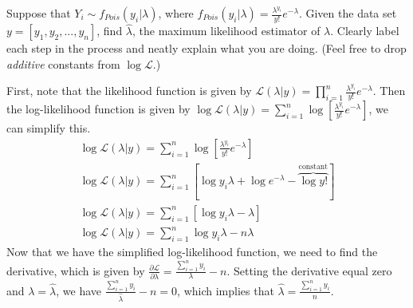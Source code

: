 \documentclass[10pt]{exam2}
\begin{document}
\begin{questions}
\question Suppose that $Y_i \sim f_{Pois}(y_i | \lambda)$, where $f_{Pois}(y_i | \lambda) = \frac{\lambda^{y_i}}{y!}e^{-\lambda}$. Given the data set $y = [y_1, y_2, ..., y_n]$, find $\hat{\lambda}$, the maximum likelihood estimator of $\lambda$. Clearly label each step in the process and neatly explain what you are doing. (Feel free to drop \emph{additive} constants from $\log \mathcal{L}$.)
\begin{solution}[4in]
First, note that the likelihood function is given by $\mathcal{L}(\lambda | y) = \prod_{i = 1}^n \frac{\lambda^{y_i}}{y!}e^{-\lambda}$. Then the log-likelihood function is given by $\log \mathcal{L}(\lambda | y) = \sum_{i = 1}^n \log \left[\frac{\lambda^{y_i}}{y!}e^{-\lambda}\right]$, we can simplify this.
\begin{equation*}
\begin{aligned}
\log \mathcal{L}(\lambda | y) = \sum_{i = 1}^n \log \left[\frac{\lambda^{y_i}}{y!}e^{-\lambda}\right]\\
\log \mathcal{L}(\lambda | y) = \sum_{i = 1}^n [ \log y_i \lambda + \log e^{-\lambda} - \overbrace{\log y!}^{\text{constant}}] \\
\log \mathcal{L}(\lambda | y) = \sum_{i = 1}^n [\log y_i \lambda - \lambda]\\
\log \mathcal{L}(\lambda | y) = \sum_{i = 1}^n \log y_i \lambda - n \lambda
\end{aligned}
\end{equation*}
Now that we have the simplified log-likelihood function, we need to find the derivative, which is given by $\frac{\partial \mathcal{L}}{\partial \lambda} = \frac{\sum_{i = 1}^n y_i}{\lambda} -n$. Setting the derivative equal zero and $\lambda = \hat{\lambda}$, we have $\frac{\sum_{i = 1}^n y_i}{\hat{\lambda}} -n = 0$, which implies that $\hat{\lambda} = \frac{\sum_{i = 1}^n y_i}{n}$.
\end{solution}

\end{questions}
\end{document}
